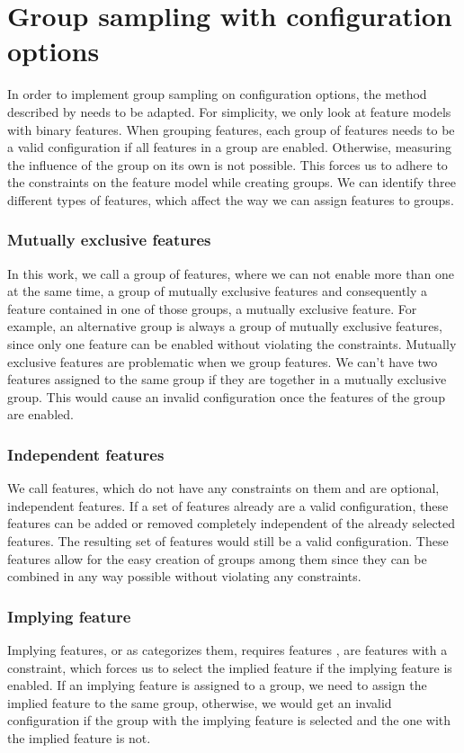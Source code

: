 \documentclass[../../thesis.tex]{subfiles}
\begin{document}
\section{Group sampling with configuration options}

In order to implement group sampling on configuration options, the method described by 
needs to be adapted. For simplicity, we only look at feature models with binary features.
When grouping features, each group of features needs to be a valid configuration if all features
in a group are enabled. Otherwise, measuring the influence of the group on its own is not possible.
This forces us to adhere to the constraints on the feature model while creating groups.
We can identify three different types of features, which affect the way we can assign features to groups.

\subsubsection{Mutually exclusive features}
In this work, we call a group of features, where we can not enable more than one at the same time,
a group of mutually exclusive features and consequently a feature contained in one of those groups,
a mutually exclusive feature.
For example, an alternative group is always a group of mutually exclusive features,
since only one feature can be enabled without violating the constraints.
Mutually exclusive features are problematic when we group features.
We can't have two features assigned to the same group if they are together in a mutually exclusive group.
This would cause an invalid configuration once the features of the group are enabled.

\subsubsection{Independent features} 
We call features, which do not have any constraints on them and are optional, independent features.
If a set of features already are a valid configuration, these features can be added or removed
completely independent of the already selected features. The resulting set of features would
still be a valid configuration. These features allow for the easy creation of groups among them
since they can be combined in any way possible without violating any constraints.

\subsubsection{Implying feature}
Implying features, or as  categorizes them, requires features \cite{benavides2010automated},
are features with a constraint, which forces us to select the implied feature
if the implying feature is enabled. If an implying feature is assigned to a group, we need to
assign the implied feature to the same group, otherwise, we would get an invalid configuration
if the group with the implying feature is selected and the one with the implied feature is not.
\end{document}

